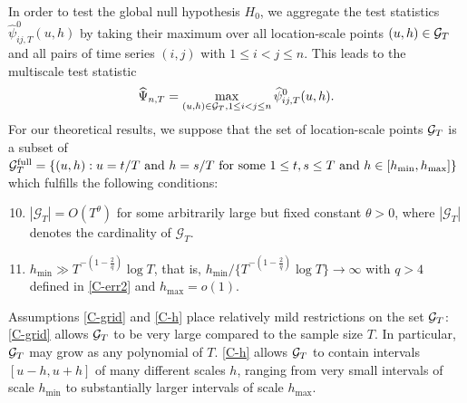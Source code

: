 \documentclass[a4paper,12pt]{article}
\begin{document}
In order to test the global null hypothesis $H_0$, we aggregate the test statistics $\widehat{\psi}^0_{ij, T}(u, h)$ by taking their maximum over all location-scale points $(u,h) \in \mathcal{G}_T$ and all pairs of time series $(i,j)$ with $1 \le i < j \le n$. This leads to the multiscale test statistic 
\[ \widehat{\Psi}_{n,T} = \max_{(u,h) \in \mathcal{G}_T, 1 \le i < j \le n} \widehat{\psi}^0_{ij, T}(u, h). \]
For our theoretical results, we suppose that the set of location-scale points $\mathcal{G}_T$ is a subset of $\mathcal{G}_T^{\text{full}} = \{ (u, h): u = t/T \text{ and } h = s/T \text{ for some } 1 \le t, s \le T \text{ and } h \in [h_{\min},h_{\max}] \}$ which fulfills the following conditions:
\begin{enumerate}[label=(C\arabic*),leftmargin=1.2cm]
\setcounter{enumi}{9}

\item \label{C-grid} $|\mathcal{G}_T| = O(T^\theta)$ for some arbitrarily large but fixed constant $\theta > 0$, where $|\mathcal{G}_T|$ denotes the cardinality of $\mathcal{G}_T$. 

\item \label{C-h} $h_{\min} \gg T^{-(1-\frac{2}{q})} \log T$, that is, $h_{\min} / \{ T^{-(1-\frac{2}{q})} \log T \} \rightarrow \infty$ with $q > 4$ defined in \ref{C-err2} and $h_{\max} = o(1)$.

\end{enumerate}
Assumptions \ref{C-grid} and \ref{C-h} place relatively mild restrictions on the set $\mathcal{G}_T$: \ref{C-grid} allows $\mathcal{G}_T$ to be very large compared to the sample size $T$. In particular, $\mathcal{G}_T$ may grow as any polynomial of $T$. \ref{C-h} allows $\mathcal{G}_T$ to contain intervals $[u-h,u+h]$ of many different scales $h$, ranging from very small intervals of scale $h_{\min}$ to substantially larger intervals of scale $h_{\max}$. 
\end{document}
